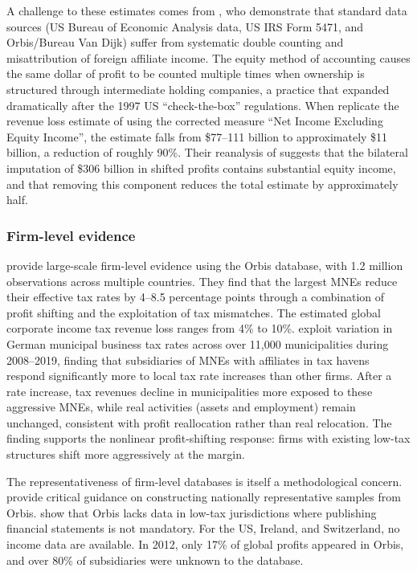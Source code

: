 \documentclass[11pt,a4paper]{article}
\begin{document}
A challenge to these estimates comes from \citet{blouin2023}, who demonstrate that standard data sources (US Bureau of Economic Analysis data, US IRS Form 5471, and Orbis/Bureau Van Dijk) suffer from systematic double counting and misattribution of foreign affiliate income. The equity method of accounting causes the same dollar of profit to be counted multiple times when ownership is structured through intermediate holding companies, a practice that expanded dramatically after the 1997 US ``check-the-box'' regulations. When \citet{blouin2023} replicate the revenue loss estimate of \citet{clausing2016} using the corrected measure ``Net Income Excluding Equity Income'', the estimate falls from \$77--111 billion to approximately \$11 billion, a reduction of roughly 90\%. Their reanalysis of \citet{torslov2023} suggests that the bilateral imputation of \$306 billion in shifted profits contains substantial equity income, and that removing this component reduces the total estimate by approximately half.


\subsubsection{Firm-level evidence}

\citet{johansson2017} provide large-scale firm-level evidence using the Orbis database, with 1.2 million observations across multiple countries. They find that the largest MNEs reduce their effective tax rates by 4--8.5 percentage points through a combination of profit shifting and the exploitation of tax mismatches. The estimated global corporate income tax revenue loss ranges from 4\% to 10\%. \citet{bilicka2026} exploit variation in German municipal business tax rates across over 11{,}000 municipalities during 2008--2019, finding that subsidiaries of MNEs with affiliates in tax havens respond significantly more to local tax rate increases than other firms. After a rate increase, tax revenues decline in municipalities more exposed to these aggressive MNEs, while real activities (assets and employment) remain unchanged, consistent with profit reallocation rather than real relocation. The finding supports the nonlinear profit-shifting response: firms with existing low-tax structures shift more aggressively at the margin.

The representativeness of firm-level databases is itself a methodological concern. \citet{kalemli-ozcan2015} provide critical guidance on constructing nationally representative samples from Orbis. \citet{torslov2023} show that Orbis lacks data in low-tax jurisdictions where publishing financial statements is not mandatory. For the US, Ireland, and Switzerland, no income data are available. In 2012, only 17\% of global profits appeared in Orbis, and over 80\% of subsidiaries were unknown to the database.
\end{document}
